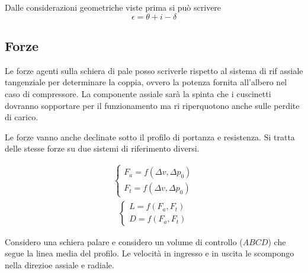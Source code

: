 Dalle considerazioni geometriche viste prima si può scrivere
\begin{equation}
\epsilon = \theta + i - \delta
\end{equation}

\subsection{Forze}
Le forze agenti sulla schiera di pale posso scriverle rispetto al sistema di rif assiale tangenziale per determinare la coppia, ovvero la potenza fornita all'albero nel caso di compressore. La componente assiale sarà la spinta che i cuscinetti dovranno sopportare per il funzionamento ma ri riperquotono anche sulle perdite di carico. 

Le forze vanno anche declinate sotto il profilo di portanza e resistenza. Si tratta delle stesse forze su due sistemi di riferimento diversi. 

\begin{align*}
	\begin{cases}
		F_a = f(\Delta v, \Delta p_0)\\
		F_t = f(\Delta v, \Delta p_0)
	\end{cases}
\end{align*}
\begin{align*}
	\begin{cases}
		L = f(F_a,F_t)\\
		D = f(F_a,F_t)
	\end{cases}
\end{align*}

Considero una schiera palare e considero un volume di controllo ($ABCD$) che segue la linea media del profilo. Le velocità in ingresso e in uscita le scompongo nella direzioe assiale e radiale. 

